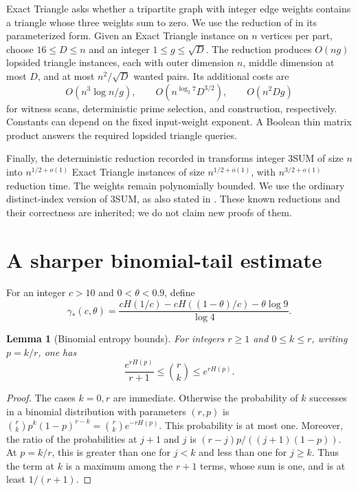 \documentclass[11pt,a4paper]{article}
\newtheorem{lemma}[theorem]{Lemma}
\theoremstyle{remark}
\newcommand{\gam}{\gamma_{\!*}}
\begin{document}
Exact Triangle asks whether a tripartite graph with integer edge weights
contains a triangle whose three weights sum to zero.
We use the reduction of \cite[Theorem 17 and Section 3.3]{AVW} in its
parameterized form. Given an Exact Triangle instance on $n$ vertices per part,
choose $16\leq D\leq n$ and an integer $1\leq g\leq\sqrt D$. The reduction
produces $O(ng)$ lopsided triangle instances, each with outer dimension $n$,
middle dimension at most $D$, and at most $n^2/\sqrt D$ wanted pairs. Its
additional costs are
\begin{equation}\label{eq:reductioncost}
 O(n^3\log n/g),\qquad O(n^{\log_2 7}D^{3/2}),\qquad O(n^2Dg)
\end{equation}
for witness scans, deterministic prime selection, and construction,
respectively. Constants can depend on the fixed input-weight exponent. A
Boolean thin matrix product answers the required lopsided triangle queries.

Finally, the deterministic reduction recorded in
\cite[Theorem 21(a)]{AVW} transforms integer 3SUM of size $n$ into
$n^{1/2+o(1)}$ Exact Triangle instances of size $n^{1/2+o(1)}$, with
$n^{3/2+o(1)}$ reduction time. The weights remain polynomially bounded.
We use the ordinary distinct-index version of 3SUM, as also stated in
\cite{formal}. These known reductions and their correctness are inherited;
we do not claim new proofs of them.

\section{A sharper binomial-tail estimate}\label{sec:tail}

For an integer $c>10$ and $0<\theta<0.9$, define
\begin{equation}\label{eq:sharp}
 \gam(c,\theta)=
 \frac{cH(1/c)-cH((1-\theta)/c)-\theta\log9}{\log4}.
\end{equation}

\begin{lemma}[Binomial entropy bounds]\label{lem:entropy}
For integers $r\geq1$ and $0\leq k\leq r$, writing $p=k/r$, one has
\[
 \frac{e^{rH(p)}}{r+1}\leq\binom rk\leq e^{rH(p)}.
\]
\end{lemma}
\begin{proof}
The cases $k=0,r$ are immediate. Otherwise the probability of $k$ successes
in a binomial distribution with parameters $(r,p)$ is
$\binom rk p^k(1-p)^{r-k}=\binom rk e^{-rH(p)}$. This probability is at
most one. Moreover, the ratio of the probabilities at $j+1$ and $j$ is
$(r-j)p/((j+1)(1-p))$. At $p=k/r$, this is greater than one for $j<k$ and
less than one for $j\geq k$. Thus the term at $k$ is a maximum among the
$r+1$ terms, whose sum is one, and is at least $1/(r+1)$.
\end{proof}
\end{document}
